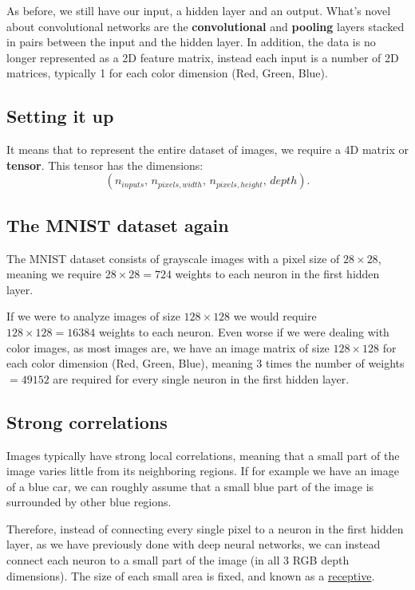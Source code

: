 \documentclass[%
oneside,                 %
final,                   %
10pt]{article}
\begin{document}
As before, we still have our input, a hidden layer and an output. What's novel about convolutional networks
are the \textbf{convolutional} and \textbf{pooling} layers stacked in pairs between the input and the hidden layer.
In addition, the data is no longer represented as a 2D feature matrix, instead each input is a number of 2D
matrices, typically 1 for each color dimension (Red, Green, Blue). 


\subsection*{Setting it up}

It means that to represent the entire
dataset of images, we require a 4D matrix or \textbf{tensor}. This tensor has the dimensions:  
\[  
(n_{inputs},\, n_{pixels, width},\, n_{pixels, height},\, depth) .
\]

\subsection*{The MNIST dataset again}

The MNIST dataset consists of grayscale images with a pixel size of
$28\times 28$, meaning we require $28 \times 28 = 724$ weights to each
neuron in the first hidden layer.

If we were to analyze images of size $128\times 128$ we would require
$128 \times 128 = 16384$ weights to each neuron. Even worse if we were
dealing with color images, as most images are, we have an image matrix
of size $128\times 128$ for each color dimension (Red, Green, Blue),
meaning 3 times the number of weights $= 49152$ are required for every
single neuron in the first hidden layer.


\subsection*{Strong correlations}
Images typically have strong local correlations, meaning that a small
part of the image varies little from its neighboring regions. If for
example we have an image of a blue car, we can roughly assume that a
small blue part of the image is surrounded by other blue regions.

Therefore, instead of connecting every single pixel to a neuron in the
first hidden layer, as we have previously done with deep neural
networks, we can instead connect each neuron to a small part of the
image (in all 3 RGB depth dimensions).  The size of each small area is
fixed, and known as a \href{{https://en.wikipedia.org/wiki/Receptive_field}}{receptive}.
\end{document}
